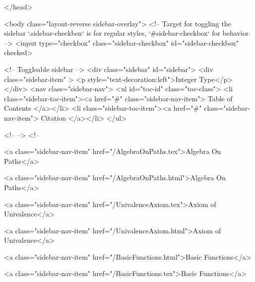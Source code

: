   
</head>




  <body class="layout-reverse sidebar-overlay">
    <!-- Target for toggling the sidebar `.sidebar-checkbox` is for regular
     styles, `#sidebar-checkbox` for behavior. -->
<input type="checkbox" class="sidebar-checkbox" id="sidebar-checkbox" checked>

<!-- Toggleable sidebar -->
<div class="sidebar" id="sidebar">
  <div class="sidebar-item" >
    <p style="text-decoration:left">Integer Type</p>
  </div>
  <nav class="sidebar-nav">
    <ul id="toc-id" class="toc-class">
  <li class="sidebar-toc-item"><a href="#" class="sidebar-nav-item"> Table of Contents </a></li>
  <li class="sidebar-toc-item"><a href="#" class="sidebar-nav-item"> Citation </a></li>
</ul>


    <!--  -->
    <!-- 
      
    
      
    
      
    
      
        
      
    
      
        
          <a class="sidebar-nav-item" href="/AlgebraOnPaths.tex">Algebra On Paths</a>
        
      
    
      
        
          <a class="sidebar-nav-item" href="/AlgebraOnPaths.html">Algebra On Paths</a>
        
      
    
      
        
          <a class="sidebar-nav-item" href="/UnivalenceAxiom.tex">Axiom of Univalence</a>
        
      
    
      
        
          <a class="sidebar-nav-item" href="/UnivalenceAxiom.html">Axiom of Univalence</a>
        
      
    
      
        
          <a class="sidebar-nav-item" href="/BasicFunctions.html">Basic Functions</a>
        
      
    
      
        
          <a class="sidebar-nav-item" href="/BasicFunctions.tex">Basic Functions</a>
        
      
    
